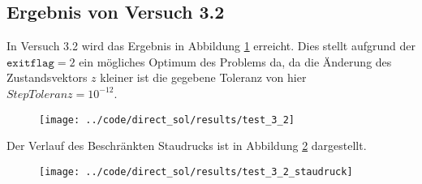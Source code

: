 \subsection{Ergebnis von Versuch 3.2}\label{kap:Versuch32}
In Versuch 3.2 wird das Ergebnis in Abbildung \ref{img:test_3_2} erreicht. Dies stellt aufgrund der $\texttt{exitflag} = 2$ ein mögliches Optimum des Problems da, da die Änderung des Zustandsvektors $z$ kleiner ist die gegebene Toleranz von hier $StepToleranz = 10^{-12}$.
\begin{figure}[H]
\begin{center}
\texttt{[image: ../code/direct\_sol/results/test\_3\_2]}
 \label{img:test_3_2}
\end{center}
\end{figure}
Der Verlauf des Beschränkten Staudrucks ist in Abbildung \ref{img:test_3_2_staudruck} dargestellt.
\begin{figure}[H]
\begin{center}
\texttt{[image: ../code/direct\_sol/results/test\_3\_2\_staudruck]}
\label{img:test_3_2_staudruck}
\end{center}
\end{figure}












\newpage
